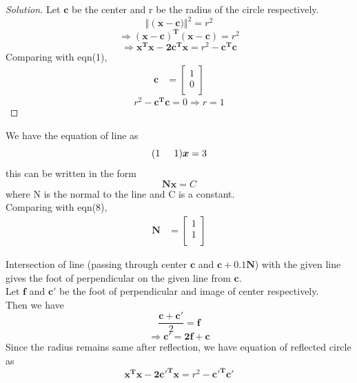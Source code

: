 \documentclass[12pt]{article}
\newenvironment{solution}{\begin{proof}[Solution]}{\end{proof}}
\begin{document}
\begin{solution}
Let $\boldsymbol{c}$ be the center and r be the radius of the circle respectively.
\begin{equation}
    \Vert\left(\boldsymbol{x - c}) \right\Vert^2 = r^2
\end{equation}
\begin{equation}
    \Rightarrow \boldsymbol{(x-c)^T(x-c)} = r^2
\end{equation}
\begin{equation}
    \Rightarrow \boldsymbol{x^Tx - 2c^Tx} = r^2 - \boldsymbol{c^Tc}
\end{equation}
Comparing with eqn(1),
\begin{align}
    \boldsymbol{c} &= \begin{bmatrix}
           1 \\
           0 \\
         \end{bmatrix}
\end{align}
\begin{equation}
    r^2 - \boldsymbol{c^Tc} = 0 \Rightarrow r = 1
\end{equation}  
\end{solution}

We have the equation of line as
\begin{equation}
    (1\hspace{5mm} 1)\boldsymbol{x} = 3
\end{equation}
this can be written in the form
\begin{equation}
    \boldsymbol{Nx = } C
\end{equation}
where N is the normal to the line and C is a constant.\\
Comparing with eqn(8),\\
\begin{align}
    \boldsymbol{N} &= \begin{bmatrix}
           1 \\
           1 \\
         \end{bmatrix}
\end{align}

Intersection of line (passing through center $\boldsymbol{c}$ and $\boldsymbol{c + 0.1N}$) with the given line gives the foot of perpendicular on the given line from $\boldsymbol{c}$.\\
Let $\boldsymbol{f}$ and $\boldsymbol{c'}$ be the foot of perpendicular and image of center respectively.\\
Then we have 
\begin{equation}
    \frac{\boldsymbol{c+c'}}{2} = \boldsymbol{f}
\end{equation}
\begin{equation}
    \Rightarrow \boldsymbol{c' = 2f + c}
\end{equation}
Since the radius remains same after reflection, we have equation of reflected circle as 
\begin{equation}
    \boldsymbol{x^Tx - 2c'^Tx} = r^2 - \boldsymbol{c'^Tc'}
\end{equation}
\end{document}
